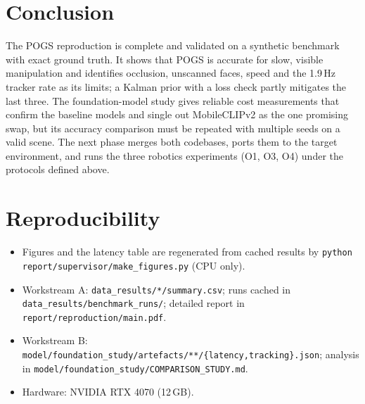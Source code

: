 \documentclass[10pt,a4paper]{article}
\begin{document}
\section{Conclusion}
The POGS reproduction is complete and validated on a synthetic benchmark with exact ground truth.
It shows that POGS is accurate for slow, visible manipulation and identifies occlusion, unscanned
faces, speed and the 1.9\,Hz tracker rate as its limits; a Kalman prior with a loss check partly
mitigates the last three. The foundation-model study gives reliable cost measurements that confirm
the baseline models and single out MobileCLIPv2 as the one promising swap, but its accuracy
comparison must be repeated with multiple seeds on a valid scene. The next phase merges both
codebases, ports them to the target environment, and runs the three robotics experiments (O1, O3,
O4) under the protocols defined above.

\appendix
\section{Reproducibility}
\begin{itemize}
\item Figures and the latency table are regenerated from cached results by
      \texttt{python report/supervisor/make\_figures.py} (CPU only).
\item Workstream A: \texttt{data\_results/*/summary.csv}; runs cached in
      \texttt{data\_results/benchmark\_runs/}; detailed report in \texttt{report/reproduction/main.pdf}.
\item Workstream B: \texttt{model/foundation\_study/artefacts/**/\{latency,tracking\}.json};
      analysis in \texttt{model/foundation\_study/COMPARISON\_STUDY.md}.
\item Hardware: NVIDIA RTX 4070 (12\,GB).
\end{itemize}
\end{document}
